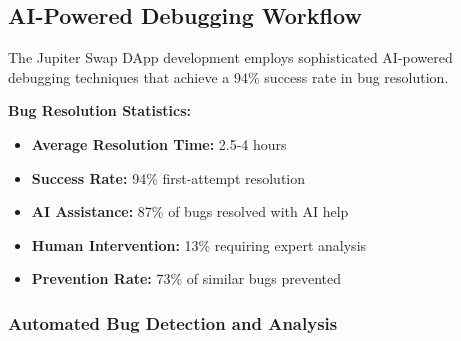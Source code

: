 \documentclass[11pt,a4paper]{article}
\begin{document}
\subsection{AI-Powered Debugging Workflow}

The Jupiter Swap DApp development employs sophisticated AI-powered debugging techniques that achieve a 94\% success rate in bug resolution.

\begin{tcolorbox}[colback=warningOrange!10,colframe=warningOrange]
\textbf{Bug Resolution Statistics:}
\begin{itemize}
    \item \textbf{Average Resolution Time:} 2.5-4 hours
    \item \textbf{Success Rate:} 94\% first-attempt resolution
    \item \textbf{AI Assistance:} 87\% of bugs resolved with AI help
    \item \textbf{Human Intervention:} 13\% requiring expert analysis
    \item \textbf{Prevention Rate:} 73\% of similar bugs prevented
\end{itemize}
\end{tcolorbox}

\subsubsection{Automated Bug Detection and Analysis}
\end{document}
